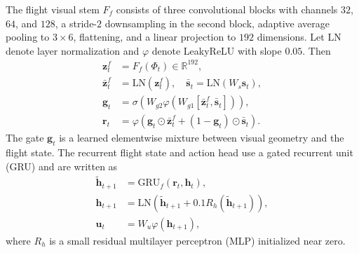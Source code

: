 \documentclass[letterpaper,journal]{IEEEtran}
\begin{document}
The flight visual stem $F_f$ consists of three convolutional blocks with
channels $32$, $64$, and $128$, a stride-$2$ downsampling in the second block,
adaptive average pooling to $3\times6$, flattening, and a linear projection to
$192$ dimensions. Let $\mathrm{LN}$ denote layer normalization and
$\varphi$ denote LeakyReLU with slope $0.05$. Then
\begin{align}
    \mathbf{z}_t^f &= F_f(\Phi_t)\in\mathbb{R}^{192},\\
    \bar{\mathbf{z}}_t^f &= \mathrm{LN}(\mathbf{z}_t^f),\quad
    \bar{\mathbf{s}}_t=\mathrm{LN}(W_s\mathbf{s}_t),\\
    \mathbf{g}_t &=
    \sigma\left(W_{g2}\varphi\left(W_{g1}
    [\bar{\mathbf{z}}_t^f,\bar{\mathbf{s}}_t]\right)\right),\\
    \mathbf{r}_t &=
    \varphi\left(
    \mathbf{g}_t\odot\bar{\mathbf{z}}_t^f+
    (1-\mathbf{g}_t)\odot\bar{\mathbf{s}}_t\right).
    \label{eq:flight_fusion}
\end{align}
The gate $\mathbf{g}_t$ is a learned elementwise mixture between visual geometry
and the flight state. The recurrent flight state and action head use a gated
recurrent unit (GRU) and are written as
\begin{align}
    \tilde{\mathbf{h}}_{t+1}
    &=\mathrm{GRU}_f(\mathbf{r}_t,\mathbf{h}_t),\\
    \mathbf{h}_{t+1}
    &=\mathrm{LN}\left(
    \tilde{\mathbf{h}}_{t+1}
    +0.1R_h(\tilde{\mathbf{h}}_{t+1})\right),\\
    \mathbf{u}_t&=W_u\varphi(\mathbf{h}_{t+1}),
    \label{eq:flight_head}
\end{align}
where $R_h$ is a small residual multilayer perceptron (MLP) initialized near
zero.
\end{document}
